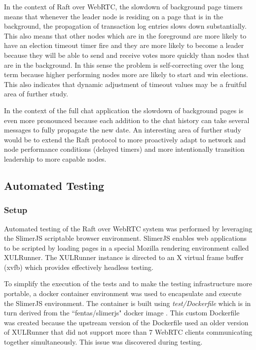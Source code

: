 \documentclass[9pt]{extarticle}
\begin{document}
\begin{multicols}{2}
In the context of Raft over WebRTC, the slowdown of background page
timers means that whenever the leader node is residing on a page that
is in the background, the propagation of transaction log entries slows
down substantially. This also means that other nodes which are in the
foreground are more likely to have an election timeout timer fire and
they are more likely to become a leader because they will be able to
send and receive votes more quickly than nodes that are in the
background.  In this sense the problem is self-correcting over
the long term because higher performing nodes more are likely to start
and win elections. This also indicates that dynamic adjustment of timeout
values may be a fruitful area of further study.

In the context of the full chat application the slowdown of background
pages is even more pronounced because each addition to the chat
history can take several messages to fully propagate the new date. An
interesting area of further study would be to extend the Raft protocol
to more proactively adapt to network and node performance conditions
(delayed timers) and more intentionally transition leadership to more
capable nodes.


\subsection{Automated Testing}

\subsubsection{Setup}

Automated testing of the Raft over WebRTC system was performed by
leveraging the SlimerJS scriptable browser environment. SlimerJS
enables web applications to be scripted by loading pages in a special
Mozilla rendering environment called XULRunner. The XULRunner instance
is directed to an X virtual frame buffer (xvfb) which provides
effectively headless testing.

To simplify the execution of the tests and to make the testing
infrastructure more portable, a docker container environment was used
to encapsulate and execute the SlimerJS environment. The container is
built using \emph{test/Dockerfile} which is in turn derived from
the ``fentas/slimerjs" docker image \cite{fentas:slimerjs}.
This custom Dockerfile was created because the upstream version of the
Dockerfile used an older version of XULRunner that did not support
more than 7 WebRTC clients communicating together simultaneously. This
issue was discovered during testing.


\end{multicols}
\end{document}
